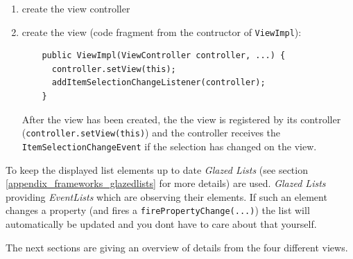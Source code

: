 \begin{enumerate}
\item create the view controller
\item create the view (code fragment from the contructor of \texttt{ViewImpl}):
  \begin{verbatim}
    public ViewImpl(ViewController controller, ...) {
      controller.setView(this);
      addItemSelectionChangeListener(controller);
    }
  \end{verbatim}
  After the view has been created, the the view is registered by its controller (\texttt{controller.setView(this)}) and the controller receives the \texttt{ItemSelectionChangeEvent} if the selection has changed on the view.
\end{enumerate}
To keep the displayed list elements up to date \textit{Glazed Lists} (see section \ref{appendix_frameworks_glazedlists} for more details) are used. \textit{Glazed Lists} providing \textit{EventLists} which are observing their elements. If such an element changes a property (and fires a \texttt{firePropertyChange(...)}) the list will automatically be updated and you dont have to care about that yourself.

The next sections are giving an overview of details from the four different views.

